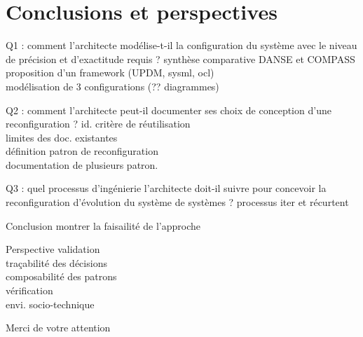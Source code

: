 \section{Conclusions et perspectives}

\begin{frame}{Q1 : comment l’architecte modélise-t-il la configuration du système avec le niveau de précision et d’exactitude requis ?
 }
synthèse comparative DANSE et COMPASS\\
proposition d'un framework (UPDM, sysml, ocl)\\
modélisation de 3 configurations (?? diagrammes)
\end{frame}

\begin{frame}{Q2 : comment l’architecte peut-il documenter ses choix de conception d’une reconfiguration ?}
id. critère de réutilisation\\
limites des doc. existantes\\
définition patron de reconfiguration\\
documentation de plusieurs patron.
\end{frame}

\begin{frame}{Q3 : quel processus d’ingénierie l’architecte doit-il
suivre pour concevoir la reconfiguration d’évolution du système de
systèmes ?}
processus iter et récurtent 
\end{frame}

\begin{frame}{Conclusion}
montrer la faisailité de l'approche\\

\end{frame}

\begin{frame}{Perspective}
validation\\
traçabilité des décisions\\
composabilité des patrons\\    
vérification\\
envi. socio-technique
\end{frame}

\begin{frame}[plain]
    Merci de votre attention
\end{frame}
